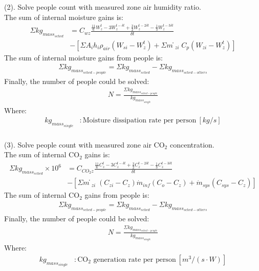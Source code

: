 \noindent (2). Solve people count with measured zone air humidity ratio. \\
\noindent The sum of internal moisture gains is:
\begin{align}
  \Sigma{kg_{mass_{sched}}} &= C_{wz}\frac {\frac{11}{6}W_{z}^{t}-3W_{z}^{t-\delta t}+\frac{3}{2}W_{z}^{t-2\delta t}-\frac{1}{3}W_{z}^{t-3\delta t}} {\delta t} \nonumber \\
  &-  [\Sigma{A_i h_i \rho_{air} (W_{si} - W_{z}^{t})} + \Sigma{ṁ_{zi} C_p (W_{zi}-W_{z}^{t})}]
\end{align}
The sum of internal moisture gains from people is:
\begin{align}
  \Sigma{kg_{mass_{sched-people}}} = \Sigma{kg_{mass_{sched}}} - \Sigma{kg_{mass_{sched-others}}}
\end{align}
Finally, the number of people could be solved:
\begin{align}
  N = \frac {\Sigma{kg_{mass_{sched-people}}}}{kg_{mass_{single}}}
\end{align}
Where:
\begin{align}
  kg_{mass_{single}} &: \text{Moisture dissipation rate per person} ~ [kg / s] \nonumber \\
\end{align}

\noindent (3). Solve people count with measured zone air CO$_2$ concentration. \\
\noindent The sum of internal CO$_2$ gains is:
\begin{align}
  \Sigma{kg_{mass_{sched}}}\times 10^{6} &= C_{CO_{2}z}\frac {\frac{11}{6}C_{z}^{t}-3C_{z}^{t-\delta t}+\frac{3}{2}C_{z}^{t-2\delta t}-\frac{1}{3}C_{z}^{t-3\delta t}} {\delta t} \nonumber \\
  &-  [\Sigma{ṁ_{zi}(C_{zi}-C_z)} \dot{m}_{inf} (C_o - C_z) + \dot{m}_{sys} (C_{sys} - C_z)]
\end{align}
The sum of internal CO$_2$ gains from people is:
\begin{align}
  \Sigma{kg_{mass_{sched-people}}} = \Sigma{kg_{mass_{sched}}} - \Sigma{kg_{mass_{sched-others}}}
\end{align}
Finally, the number of people could be solved:
\begin{align}
  N = \frac {\Sigma{kg_{mass_{sched-people}}}}{kg_{mass_{single}}}
\end{align}
Where:
\begin{align}
  kg_{mass_{single}} &: \text{CO$_2$ generation rate per person} ~ [m^{3}/(s \cdot W)] \nonumber \\
\end{align}

